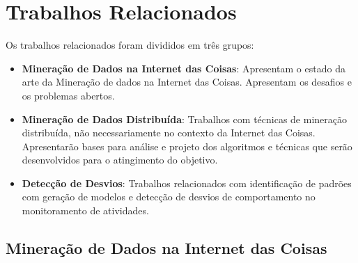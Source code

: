\section{Trabalhos Relacionados} \label{sec:trabRelac}

Os trabalhos relacionados foram divididos em três grupos: \begin{itemize}
    \item \textbf{Mineração de Dados na Internet das Coisas}: Apresentam o estado da arte da Mineração de dados na Internet das Coisas. Apresentam os desafios e os problemas abertos.
    \item \textbf{Mineração de Dados Distribuída}: Trabalhos com técnicas de mineração distribuída, não necessariamente no contexto da Internet das Coisas. \linebreak
    Apresentarão bases para análise e projeto dos algoritmos e técnicas que serão desenvolvidos  para o atingimento do objetivo.
    \item \textbf{Detecção de Desvios}: Trabalhos relacionados com identificação de padrões com geração de modelos e detecção de desvios de comportamento no monitoramento de atividades.
    \end{itemize}

\subsection{Mineração de Dados na Internet das Coisas}


